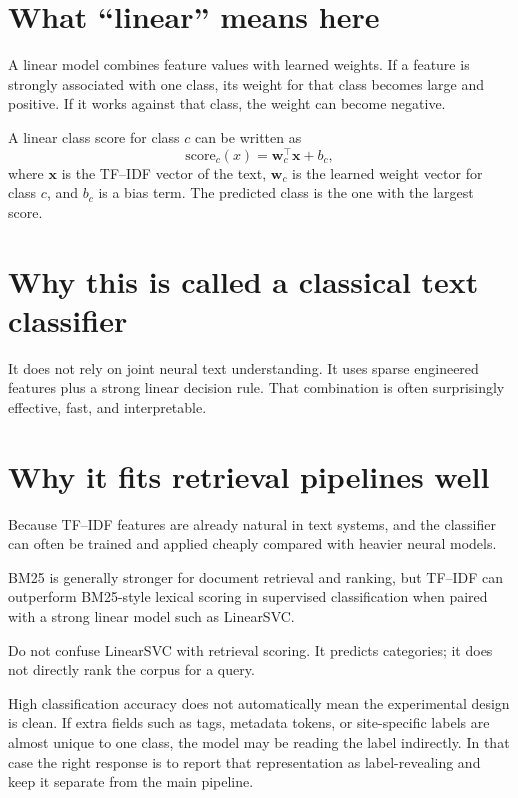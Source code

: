 \documentclass[11pt,oneside]{report}
\newcommand{\vect}[1]{\mathbf{#1}}
\begin{document}
\section*{What ``linear'' means here}
A linear model combines feature values with learned weights. If a feature is strongly associated with one class, its weight for that class becomes large and positive. If it works against that class, the weight can become negative.

\begin{formulabox}
A linear class score for class $c$ can be written as
\[
\mathrm{score}_c(x)=\vect{w}_c^\top \vect{x}+b_c,
\]
where $\vect{x}$ is the TF--IDF vector of the text, $\vect{w}_c$ is the learned weight vector for class $c$, and $b_c$ is a bias term. The predicted class is the one with the largest score.
\end{formulabox}

\section*{Why this is called a classical text classifier}
It does not rely on joint neural text understanding. It uses sparse engineered features plus a strong linear decision rule. That combination is often surprisingly effective, fast, and interpretable.

\section*{Why it fits retrieval pipelines well}
Because TF--IDF features are already natural in text systems, and the classifier can often be trained and applied cheaply compared with heavier neural models.

BM25 is generally stronger for document retrieval and ranking, but TF--IDF can outperform BM25-style lexical scoring in supervised classification when paired with a strong linear model such as LinearSVC.

\begin{warningbox}
Do not confuse LinearSVC with retrieval scoring. It predicts categories; it does not directly rank the corpus for a query.
\end{warningbox}

\begin{warningbox}
High classification accuracy does not automatically mean the experimental design is clean. If extra fields such as tags, metadata tokens, or site-specific labels are almost unique to one class, the model may be reading the label indirectly. In that case the right response is to report that representation as label-revealing and keep it separate from the main pipeline.
\end{warningbox}
\end{document}
